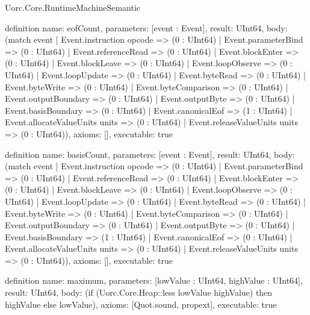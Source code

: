 \begin{lexlean}{Uorc.Core.RuntimeMachineSemantic}
\begin{semanticmodule}
definition{
  name: eofCount,
  parameters: [event : Event],
  result: UInt64,
  body: (match event
    | Event.instruction opcode => (0 : UInt64)
    | Event.parameterBind => (0 : UInt64)
    | Event.referenceRead => (0 : UInt64)
    | Event.blockEnter => (0 : UInt64)
    | Event.blockLeave => (0 : UInt64)
    | Event.loopObserve => (0 : UInt64)
    | Event.loopUpdate => (0 : UInt64)
    | Event.byteRead => (0 : UInt64)
    | Event.byteWrite => (0 : UInt64)
    | Event.byteComparison => (0 : UInt64)
    | Event.outputBoundary => (0 : UInt64)
    | Event.outputByte => (0 : UInt64)
    | Event.basisBoundary => (0 : UInt64)
    | Event.canonicalEof => (1 : UInt64)
    | Event.allocateValueUnits units => (0 : UInt64)
    | Event.releaseValueUnits units => (0 : UInt64)),
  axioms: [],
  executable: true
}

definition{
  name: basisCount,
  parameters: [event : Event],
  result: UInt64,
  body: (match event
    | Event.instruction opcode => (0 : UInt64)
    | Event.parameterBind => (0 : UInt64)
    | Event.referenceRead => (0 : UInt64)
    | Event.blockEnter => (0 : UInt64)
    | Event.blockLeave => (0 : UInt64)
    | Event.loopObserve => (0 : UInt64)
    | Event.loopUpdate => (0 : UInt64)
    | Event.byteRead => (0 : UInt64)
    | Event.byteWrite => (0 : UInt64)
    | Event.byteComparison => (0 : UInt64)
    | Event.outputBoundary => (0 : UInt64)
    | Event.outputByte => (0 : UInt64)
    | Event.basisBoundary => (1 : UInt64)
    | Event.canonicalEof => (0 : UInt64)
    | Event.allocateValueUnits units => (0 : UInt64)
    | Event.releaseValueUnits units => (0 : UInt64)),
  axioms: [],
  executable: true
}

definition{
  name: maximum,
  parameters: [lowValue : UInt64, highValue : UInt64],
  result: UInt64,
  body: (if (Uorc.Core.Heap::less lowValue highValue) then highValue else lowValue),
  axioms: [Quot.sound, propext],
  executable: true
}


\end{semanticmodule}
\end{lexlean}
